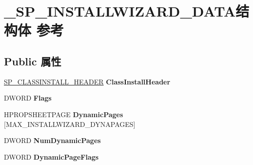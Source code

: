 \hypertarget{struct___s_p___i_n_s_t_a_l_l_w_i_z_a_r_d___d_a_t_a}{}\section{\+\_\+\+S\+P\+\_\+\+I\+N\+S\+T\+A\+L\+L\+W\+I\+Z\+A\+R\+D\+\_\+\+D\+A\+T\+A结构体 参考}
\label{struct___s_p___i_n_s_t_a_l_l_w_i_z_a_r_d___d_a_t_a}
\subsection*{Public 属性}
\begin{DoxyCompactItemize}
\item 
\mbox{\label{struct___s_p___i_n_s_t_a_l_l_w_i_z_a_r_d___d_a_t_a_a23018c19e3a63b9fb462341f35c6d5cc}} 
\hyperlink{struct___s_p___c_l_a_s_s_i_n_s_t_a_l_l___h_e_a_d_e_r}{S\+P\+\_\+\+C\+L\+A\+S\+S\+I\+N\+S\+T\+A\+L\+L\+\_\+\+H\+E\+A\+D\+ER} {\bfseries Class\+Install\+Header}
\item 
\mbox{\label{struct___s_p___i_n_s_t_a_l_l_w_i_z_a_r_d___d_a_t_a_a4e1dab85c42665c373ab42aebe4926b6}} 
D\+W\+O\+RD {\bfseries Flags}
\item 
\mbox{\label{struct___s_p___i_n_s_t_a_l_l_w_i_z_a_r_d___d_a_t_a_a9461f741c889299519af91c12fae8e06}} 
H\+P\+R\+O\+P\+S\+H\+E\+E\+T\+P\+A\+GE {\bfseries Dynamic\+Pages} \mbox{[}M\+A\+X\+\_\+\+I\+N\+S\+T\+A\+L\+L\+W\+I\+Z\+A\+R\+D\+\_\+\+D\+Y\+N\+A\+P\+A\+G\+ES\mbox{]}
\item 
\mbox{\label{struct___s_p___i_n_s_t_a_l_l_w_i_z_a_r_d___d_a_t_a_a0f17776751d2233b615035bdb6245270}} 
D\+W\+O\+RD {\bfseries Num\+Dynamic\+Pages}
\item 
\mbox{\label{struct___s_p___i_n_s_t_a_l_l_w_i_z_a_r_d___d_a_t_a_ac34fe08868e8036ac5a1f53653b98013}} 
D\+W\+O\+RD {\bfseries Dynamic\+Page\+Flags}
\item 
\mbox{\label{struct___s_p___i_n_s_t_a_l_l_w_i_z_a_r_d___d_a_t_a_a58e099df64f4d46640109f1be6b00c66}} 

\end{DoxyCompactItemize}
